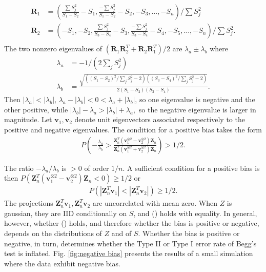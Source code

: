 \documentclass[12pt]{article}
\renewcommand{\P}{P}
\newcommand{\z}{Z}
\newcommand{\s}{S}
\newcommand{\zvec}{\vec{Z}_n}
\renewcommand{\vec}[1]{\textbf{#1}}
\newcommand{\Svec}{\vec{R}}
\newcommand{\eval}{\lambda}
\newcommand{\evec}{\vec{v}}
\begin{document}
      \begin{align}
        \Svec_1&=\left(\frac{\sum\s_j^2}{\s_1-\s_2}-\s_1, \frac{-\sum\s_j^2}{\s_1-\s_2}-\s_2,-\s_3,\ldots,-\s_n\right)/ \sum\s_j^2  \\
        \Svec_2&=\left(-\s_1,-\s_2,\frac{\sum \s_j^2}{\s_3-\s_4}-\s_3, \frac{-\sum \s_j^2}{\s_3-\s_4}-\s_4,-\s_5,\ldots,-\s_n\right)/ \sum \s_j^2.\\
      \end{align}
      The two nonzero eigenvalues of $(\Svec_1\Svec_2^T+\Svec_2\Svec_1^T)/2$ are $\eval_a\pm\eval_b$ where
      \begin{align}
        \eval_a&=-1/(2\sum_j\s_j^2)\\
        \eval_b&=\frac{\sqrt{((\s_1-\s_2)^2/\sum_j\s_j^2-2)((\s_3-\s_4)^2/\sum_j\s_j^2-2)}}{2(\s_1-\s_2)(\s_3-\s_4)}.
      \end{align}
      Then $|\eval_a|<|\eval_b|$,
      $\eval_a-|\eval_b|<0<\eval_a+|\eval_b|$, so one eigenvalue is
      negative and the other positive, while
      $|\eval_b| - \eval_a> |\eval_b|+ \eval_a,$ so the negative
      eigenvalue is larger in magnitude. Let $\evec_1,\evec_2$ denote
      unit eigenvectors associated respectively to the positive and
      negative eigenvalues. The condition for a positive bias takes
      the form
      \begin{align}
        \P\left( -\frac{\eval_a}{\eval_b} > \frac{\zvec^T(\evec_1^{\otimes 2}-\evec_2^{\otimes 2})\zvec}{\zvec^T(\evec_1^{\otimes 2}+\evec_2^{\otimes 2})\zvec} \right) > 1/2.\label{eqn:iff_cond}
      \end{align}

      The ratio $-\eval_a/\eval_b$ is $>0$ of order $1/n$. A
      sufficient condition for a positive bias is then
      $\P(\zvec^T(\evec_1^{\otimes 2}-\evec_2^{\otimes 2})\zvec<0)\ge 1/2$
      or
      \begin{align}
        \P(|\zvec^T\evec_1|<|\zvec^T\evec_2|)\ge 1/2.\label{eqn:suff_cond}
      \end{align}
      The projections $\zvec^T\evec_1,\zvec^T\evec_2$ are uncorrelated
      with mean zero. When $\z$ is gaussian, they are IID
      conditionally on $\s$, and () holds with
      equality. In general, however, whether () %
      holds, and therefore whether the bias is positive or negative,
      depends on the distributions of $\z$ and of $\s$. Whether the
      bias is positive or negative, in turn, determines whether the
      Type II or Type I error rate of Begg's test is
      inflated. Fig. \ref{fig:negative bias} presents the results of a
      small simulation where the data exhibit negative bias.
\end{document}
